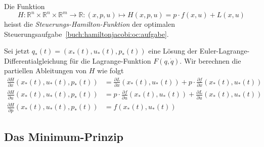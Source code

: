 \begin{definition}
Die Funktion
\[
H
\colon
\mathbb{R}^n\times\mathbb{R}^n\times\mathbb{R}^m
\to
\mathbb{R}
:
(x,p,u)
\mapsto
H(x,p,u)
=
p\cdot f(x,u) + L(x,u)
\]
heisst die {\em Steuerungs-Hamilton-Funktion}
der optimalen Steuerungsaufgabe~\ref{buch:hamiltonjacobi:oc:aufgabe}.
\end{definition}

Sei jetzt $q_*(t)=(x_*(t),u_*(t),p_*(t))$ eine Lösung der
Euler-Lagrange-Differentialgleichung für die Lagrange-Funktion
$F(q,\dot{q})$.
Wir berechnen die partiellen Ableitungen von $H$ wie folgt
\begin{align*}
\frac{\partial H}{\partial x}(x_*(t),u_*(t),p_*(t))
&=
\frac{\partial L}{\partial x}(x_*(t),u_*(t))
+
p\cdot\frac{\partial f}{\partial x}(x_*(t),u_*(t))
\\
\frac{\partial H}{\partial u}(x_*(t),u_*(t),p_*(t))
&=
p\cdot
\frac{\partial f}{\partial u}(x_*(t),u_*(t))
+
\frac{\partial L}{\partial u}(x_*(t),u_*(t))
\\
\frac{\partial H}{\partial p}(x_*(t),u_*(t),p_*(t))
&=
f(x_*(t),u_*(t))
\end{align*}

\begin{satz}
\end{satz}

%
%
\subsection{Das Minimum-Prinzip
\label{buch:hamiltonjacobi:oc:subsection:minimum}}



